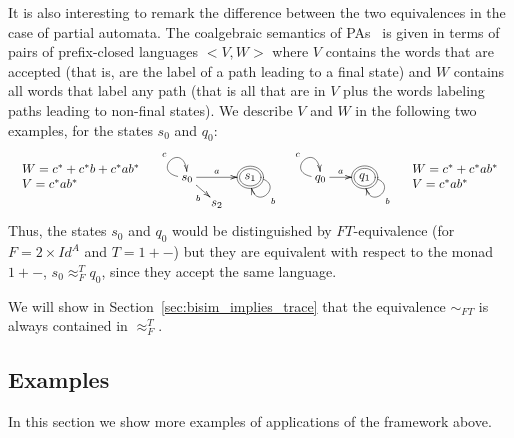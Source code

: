 \documentclass{LMCS}
\begin{document}
It is also interesting to remark the difference between the two
equivalences in the case of partial automata.
The coalgebraic semantics of PAs~\cite{jan99} is given in terms of pairs of
prefix-closed languages $<V,W>$ where $V$ contains the
words that are accepted (that is, are the label of a path leading to
a final state) and $W$ contains all words that label any path (that
is all that are in $V$ plus the words labeling paths leading to
non-final states). We describe $V$ and $W$  in the
following two examples, for the states $s_0$ and $q_0$:
\[
\begin{array}{llll}
\begin{array}{l}
W = c^* + c^*b + c^*ab^*\\
V = c^*ab^*
\end{array}
& \xymatrix@C=0.3cm@R=0.2cm{
s_0 \ar[dr]_-b \ar[rr]^-a \ar@(l,u)^{c} & & *++[o][F=]{s_1}  \ar@(r,d)^{b} \\
&s_2} & \xymatrix@C=0.2cm@R=0.2cm{q_0 \ar[rr]^-a
\ar@(l,u)^{c}&&*++[o][F=]{q_1}\ar@(r,d)^{b}} &
\begin{array}{l}
W = c^* + c^*ab^*\\
V = c^*ab^*
\end{array}
\end{array}
\]
Thus, the states $s_0$ and $q_0$ would be distinguished by
$FT$-equivalence (for $F=2\times Id^A$ and $T=1+-$) but they are
equivalent with respect to the monad $1+-$, $s_0\approx_F^{T} q_0$,
since they accept the same language.

We will show in Section~\ref{sec:bisim_implies_trace} that the
equivalence $\sim_{FT}$ is always contained in $\approx^T_F$.
\subsection{Examples}\label{sec:examples}
In this section we show more examples of applications of the
framework above.
\end{document}

